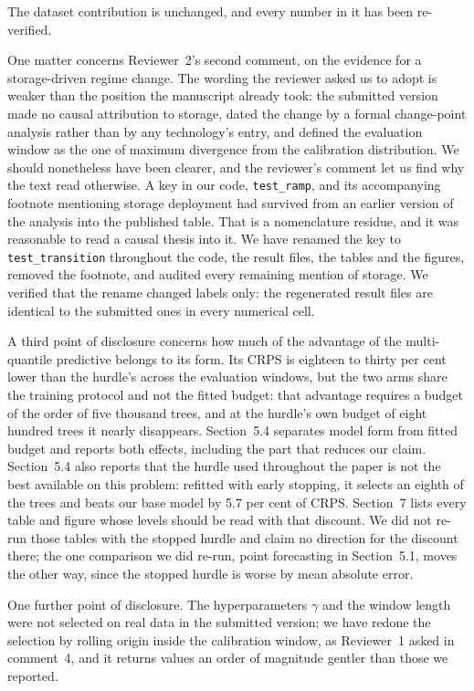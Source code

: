 \documentclass[11pt,a4paper]{article}
\begin{document}
The dataset contribution is unchanged, and every number in it has been re-verified.

One matter concerns Reviewer~2's second comment, on the evidence for a storage-driven regime change. The wording the reviewer asked us to adopt is weaker than the position the manuscript already took: the submitted version made no causal attribution to storage, dated the change by a formal change-point analysis rather than by any technology's entry, and defined the evaluation window as the one of maximum divergence from the calibration distribution. We should nonetheless have been clearer, and the reviewer's comment let us find why the text read otherwise. A key in our code, \texttt{test\_ramp}, and its accompanying footnote mentioning storage deployment had survived from an earlier version of the analysis into the published table. That is a nomenclature residue, and it was reasonable to read a causal thesis into it. We have renamed the key to \texttt{test\_transition} throughout the code, the result files, the tables and the figures, removed the footnote, and audited every remaining mention of storage. We verified that the rename changed labels only: the regenerated result files are identical to the submitted ones in every numerical cell.

A third point of disclosure concerns how much of the advantage of the multi-quantile predictive belongs to its form. Its CRPS is eighteen to thirty per cent lower than the hurdle's across the evaluation windows, but the two arms share the training protocol and not the fitted budget: that advantage requires a budget of the order of five thousand trees, and at the hurdle's own budget of eight hundred trees it nearly disappears. Section~5.4 separates model form from fitted budget and reports both effects, including the part that reduces our claim. Section~5.4 also reports that the hurdle used throughout the paper is not the best available on this problem: refitted with early stopping, it selects an eighth of the trees and beats our base model by 5.7 per cent of CRPS. Section~7 lists every table and figure whose levels should be read with that discount. We did not re-run those tables with the stopped hurdle and claim no direction for the discount there; the one comparison we did re-run, point forecasting in Section~5.1, moves the other way, since the stopped hurdle is worse by mean absolute error.

One further point of disclosure. The hyperparameters $\gamma$ and the window length were not selected on real data in the submitted version; we have redone the selection by rolling origin inside the calibration window, as Reviewer~1 asked in comment~4, and it returns values an order of magnitude gentler than those we reported.
\end{document}
